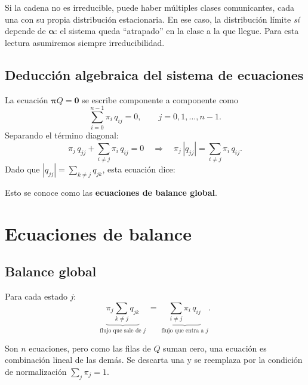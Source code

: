 \documentclass[11pt,a4paper]{article}
\theoremstyle{definition}
\theoremstyle{remark}
\begin{document}
\begin{cajanota}
Si la cadena no es irreducible, puede haber múltiples clases
comunicantes, cada una con su propia distribución estacionaria.  En ese
caso, la distribución límite \emph{sí} depende de $\boldsymbol{\alpha}$:
el sistema queda ``atrapado'' en la clase a la que llegue.  Para esta
lectura asumiremos siempre irreducibilidad.
\end{cajanota}

\subsection{Deducción algebraica del sistema de ecuaciones}

La ecuación $\boldsymbol{\pi}Q = \boldsymbol{0}$ se escribe componente
a componente como
\[
  \sum_{i=0}^{n-1}\pi_i\,q_{ij} = 0, \qquad j = 0,1,\dots,n-1.
\]
Separando el término diagonal:
\[
  \pi_j\,q_{jj} + \sum_{i\ne j}\pi_i\,q_{ij} = 0
  \quad\Longrightarrow\quad
  \pi_j\,|q_{jj}| = \sum_{i\ne j}\pi_i\,q_{ij}.
\]
Dado que $|q_{jj}| = \sum_{k\ne j}q_{jk}$, esta ecuación dice:

\begin{center}
\end{center}

Esto se conoce como las \textbf{ecuaciones de balance global}.

\section{Ecuaciones de balance}

\subsection{Balance global}

Para cada estado $j$:
\[
  \underbrace{\pi_j \sum_{k\ne j} q_{jk}}_{\text{flujo que sale de }j}
  \;=\;
  \underbrace{\sum_{i\ne j}\pi_i\,q_{ij}}_{\text{flujo que entra a }j}.
\]

Son $n$ ecuaciones, pero como las filas de $Q$ suman cero, una ecuación
es combinación lineal de las demás.  Se descarta una y se reemplaza por
la condición de normalización $\sum_j \pi_j = 1$.
\end{document}
